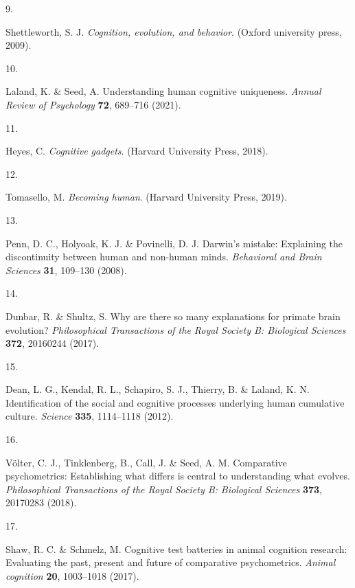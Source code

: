 \documentclass[
  man,floatsintext]{apa6}
\newlength{\cslhangindent}
\newlength{\csllabelwidth}
\newlength{\cslentryspacingunit} %
\newenvironment{CSLReferences}[2] %
 {%
  \setlength{\parindent}{0pt}
  \ifodd #1
  \let\oldpar\par
  \def\par{\hangindent=\cslhangindent\oldpar}
  \fi
  \setlength{\parskip}{#2\cslentryspacingunit}
 }%
 {}
\newcommand{\CSLLeftMargin}[1]{\parbox[t]{\csllabelwidth}{#1}}
\newcommand{\CSLRightInline}[1]{\parbox[t]{\linewidth - \csllabelwidth}{#1}\break}
\begin{document}
\begin{CSLReferences}{0}{0}
\leavevmode{}%
\CSLLeftMargin{9. }%
\CSLRightInline{Shettleworth, S. J. \emph{Cognition, evolution, and behavior}. (Oxford university press, 2009).}

\leavevmode{}%
\CSLLeftMargin{10. }%
\CSLRightInline{Laland, K. \& Seed, A. Understanding human cognitive uniqueness. \emph{Annual Review of Psychology} \textbf{72}, 689--716 (2021).}

\leavevmode{}%
\CSLLeftMargin{11. }%
\CSLRightInline{Heyes, C. \emph{Cognitive gadgets}. (Harvard University Press, 2018).}

\leavevmode{}%
\CSLLeftMargin{12. }%
\CSLRightInline{Tomasello, M. \emph{Becoming human}. (Harvard University Press, 2019).}

\leavevmode{}%
\CSLLeftMargin{13. }%
\CSLRightInline{Penn, D. C., Holyoak, K. J. \& Povinelli, D. J. Darwin's mistake: Explaining the discontinuity between human and non-human minds. \emph{Behavioral and Brain Sciences} \textbf{31}, 109--130 (2008).}

\leavevmode{}%
\CSLLeftMargin{14. }%
\CSLRightInline{Dunbar, R. \& Shultz, S. Why are there so many explanations for primate brain evolution? \emph{Philosophical Transactions of the Royal Society B: Biological Sciences} \textbf{372}, 20160244 (2017).}

\leavevmode{}%
\CSLLeftMargin{15. }%
\CSLRightInline{Dean, L. G., Kendal, R. L., Schapiro, S. J., Thierry, B. \& Laland, K. N. Identification of the social and cognitive processes underlying human cumulative culture. \emph{Science} \textbf{335}, 1114--1118 (2012).}

\leavevmode{}%
\CSLLeftMargin{16. }%
\CSLRightInline{Völter, C. J., Tinklenberg, B., Call, J. \& Seed, A. M. Comparative psychometrics: Establishing what differs is central to understanding what evolves. \emph{Philosophical Transactions of the Royal Society B: Biological Sciences} \textbf{373}, 20170283 (2018).}

\leavevmode{}%
\CSLLeftMargin{17. }%
\CSLRightInline{Shaw, R. C. \& Schmelz, M. Cognitive test batteries in animal cognition research: Evaluating the past, present and future of comparative psychometrics. \emph{Animal cognition} \textbf{20}, 1003--1018 (2017).}


\end{CSLReferences}
\end{document}
